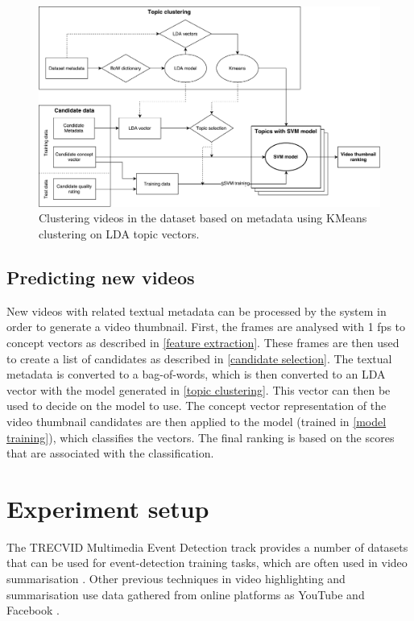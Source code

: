 \documentclass{../resources/sig-alternate-05-2015}
\begin{document}

\begin{figure}[ht]
  \label{topic clustering scheme}
  \includegraphics[width=\textwidth]{resources/topic-clustering}
  \caption{Clustering videos in the dataset based on metadata using KMeans clustering on LDA topic vectors.}
\end{figure}

\subsection{Predicting new videos}

New videos with related textual metadata can be processed by the system in order to generate a video thumbnail. First, the frames are analysed with 1 fps to concept vectors as described in \ref{feature extraction}. These frames are then used to create a list of candidates as described in \ref{candidate selection}. The textual metadata is converted to a bag-of-words, which is then converted to an LDA vector with the model generated in \ref{topic clustering}. This vector can then be used to decide on the model to use. The concept vector representation of the video thumbnail candidates are then applied to the model (trained in \ref{model training}), which classifies the vectors. The final ranking is based on the scores that are associated with the classification.



\section{Experiment setup}
\label{experiment setup dataset}

The TRECVID Multimedia Event Detection track provides a number of datasets that can be used for event-detection training tasks, which are often used in video summarisation \cite{Ajmal:2012hi, Christel:2004in, Money:2008fn}. Other previous techniques in video highlighting and summarisation use data gathered from online platforms as YouTube and Facebook \cite{Yang:2015gi, Almeida:2012be}.
\end{document}
